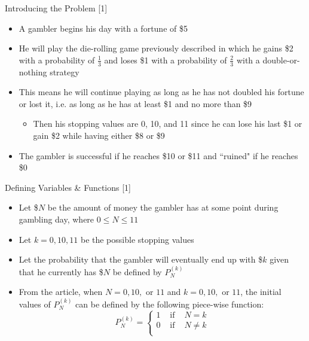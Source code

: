 \documentclass[14pt]{beamer}
\begin{document}
\begin{frame}{Introducing the Problem [1]}
 \begin{itemize}
     \item A gambler begins his day with a fortune of \$5
     \item He will play the die-rolling game previously described in which he gains \$2 with a probability of $\frac{1}{3}$ and loses \$1 with a probability of $\frac{2}{3}$ with a double-or-nothing strategy
     \item This means he will continue playing as long as he has not doubled his fortune or lost it, i.e. as long as he has at least \$1 and no more than \$9
     \begin{itemize}
         \item Then his stopping values are 0, 10, and 11 since he can lose his last \$1 or gain \$2 while having either \$8 or \$9
     \end{itemize}
     \item The gambler is successful if he reaches \$10 or \$11 and ``ruined" if he reaches \$0
 \end{itemize}   
\end{frame}

\begin{frame}{Defining Variables \& Functions [1]}
 \begin{itemize}
     \item Let \$$N$ be the amount of money the gambler has at some point during gambling day, where $0 \leq N \leq 11$
     \item Let $k = 0, 10, 11$ be the possible stopping values
     \item Let the probability that the gambler will eventually end up with \$$k$ given that he currently has \$$N$ be defined by $P^{(k)}_N$
     \item From the article, when $N = 0, 10, \text{ or } 11$ and $k = 0, 10, \text{ or } 11$, the initial values of $P^{(k)}_N$ can be defined by the following piece-wise function:
        $$P^{(k)}_N = 
        \left\{
        \begin{array}{ccc}
        1 & \text{ if } & N = k \\
        0 & \text{ if } & N \neq k \\
        \end{array}
        \right.$$
 \end{itemize}
\end{frame}
\end{document}
